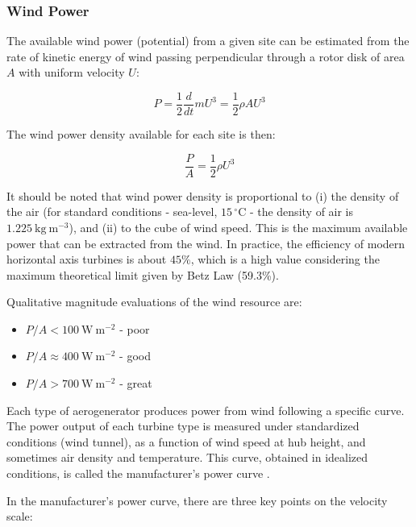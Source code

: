 \FloatBarrier
\subsubsection{Wind Power}

The available wind power (potential) from a given site can be estimated from the rate of kinetic energy of wind passing perpendicular through a rotor disk of area $A$ with uniform velocity $U$:

\begin{equation}
    P = \dfrac{1}{2} \dfrac{d}{dt}mU^3 = \dfrac{1}{2} \rho A U^3
\end{equation}

The wind power density available for each site is then:

\begin{equation}
    \dfrac{P}{A} = \dfrac{1}{2} \rho U^3
\end{equation}

It should be noted that wind power density is proportional to (i) the density of the air (for standard conditions - sea-level, $15\,^{\circ}\mathrm{C}$ - the density of air is $1.225\mathrm{\ kg\ m^{-3}}$), and (ii) to the cube of wind speed. This is the maximum available power that can be extracted from the wind. In practice, the efficiency of modern horizontal axis turbines is about $45 \%$, which is a high value considering the maximum theoretical limit given by Betz Law (59.3\%). 

Qualitative magnitude evaluations of the wind resource are:

\begin{itemize}
    \item $P/A < 100\mathrm{\ W\ m^{-2}}$ - poor
    \item $P/A \approx 400\mathrm{\ W\ m^{-2}}$ - good
    \item $P/A > 700\mathrm{\ W\ m^{-2}}$ - great
\end{itemize}

Each type of aerogenerator produces power from wind following a specific curve. The power output of each turbine type is measured under standardized conditions (wind tunnel), as a function of wind speed at hub height, and sometimes air density and temperature. This curve, obtained in idealized conditions, is called the manufacturer's power curve \citep{Manwell2002}.

In the manufacturer's power curve, there are three key points on the velocity scale:

